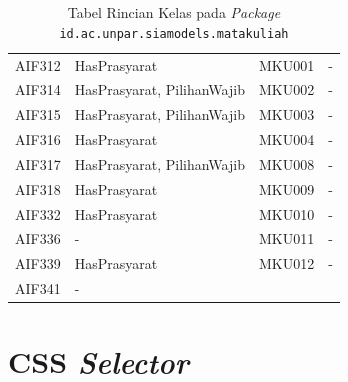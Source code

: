 \begin{enumerate}
\begin{table}[H]
\begin{tabular}{|p{2.5cm}|p{4.5cm}|p{2.5cm}|p{4.5cm}|}
    AIF312  & HasPrasyarat               &    MKU001  & -                          \\
    AIF314  & HasPrasyarat, PilihanWajib &    MKU002  & -                          \\
    AIF315  & HasPrasyarat, PilihanWajib &    MKU003  & -                          \\
    AIF316  & HasPrasyarat               &    MKU004  & -                          \\
    AIF317  & HasPrasyarat, PilihanWajib &    MKU008  & -                          \\
    AIF318  & HasPrasyarat               &    MKU009  & -                          \\
    AIF332  & HasPrasyarat               &    MKU010  & -                          \\
    AIF336  & -                          &    MKU011  & -                          \\
    AIF339  & HasPrasyarat               &    MKU012  & -                          \\
    AIF341  & -                          &            &           				   \\
		\hline
    \end{tabular}
		\caption{Tabel Rincian Kelas pada \textit{Package} \texttt{id.ac.unpar.siamodels.matakuliah}}
	\label{tab:2_kelas_matakuliah}
\end{table}

\end{enumerate}

\section{CSS \textit{Selector}}
\label{sec:selector}

